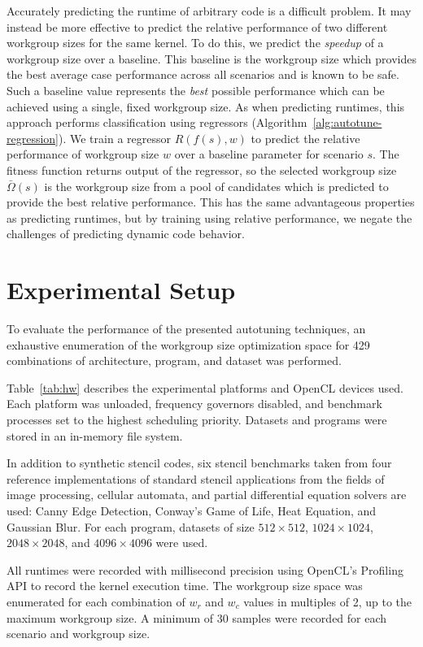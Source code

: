   Accurately predicting the runtime of arbitrary code is a difficult
  problem. It may instead be more effective to predict the relative
  performance of two different workgroup sizes for the same kernel. To
  do this, we predict the \emph{speedup} of a workgroup size over a
  baseline. This baseline is the workgroup size which provides the best
  average case performance across all scenarios and is known to be
  safe. Such a baseline value represents the \emph{best} possible
  performance which can be achieved using a single, fixed workgroup
  size. As when predicting runtimes, this approach performs
  classification using regressors
  (Algorithm~\ref{alg:autotune-regression}). We train a regressor
  $R(f(s), w)$ to predict the relative performance of workgroup size $w$
  over a baseline parameter for scenario $s$. The fitness function
  returns output of the regressor, so the selected workgroup size
  $\bar{\Omega}(s)$ is the workgroup size from a pool of candidates
  which is predicted to provide the best relative performance. This has
  the same advantageous properties as predicting runtimes, but by
  training using relative performance, we negate the challenges of
  predicting dynamic code behavior.


  \section{Experimental Setup}

  To evaluate the performance of the presented autotuning techniques, an
  exhaustive enumeration of the workgroup size optimization space for
  429 combinations of architecture, program, and dataset was performed.

  Table~\ref{tab:hw} describes the experimental platforms and OpenCL devices used. Each platform was unloaded, frequency governors disabled, and benchmark processes set to the highest scheduling priority. Datasets and programs were stored in an in-memory file system.

  In addition to synthetic stencil codes, six stencil benchmarks taken from four reference implementations of standard stencil applications from the fields of image processing, cellular automata, and partial differential equation solvers are used: Canny Edge Detection, Conway's Game of Life, Heat Equation, and Gaussian Blur. For each program, datasets of size $512\times512$, $1024\times1024$, $2048\times2048$, and $4096\times4096$ were used.

  All runtimes were recorded with millisecond precision using OpenCL's
  Profiling API to record the kernel execution time. The workgroup size
  space was enumerated for each combination of $w_r$ and $w_c$ values in
  multiples of 2, up to the maximum workgroup size. A minimum of 30
  samples were recorded for each scenario and workgroup size.

